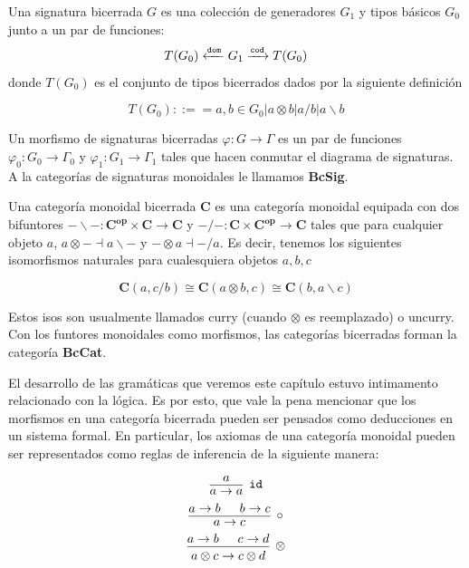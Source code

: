 \documentclass[../main.tex]{subfiles}
\begin{document}
	
	\begin{dfn}
	Una signatura bicerrada $G$ es una colección de generadores $G_1$ y tipos básicos $G_0$ junto a un par de funciones: \\
		$$T(G_0) \xleftarrow{\tt{dom}} G_1 \xrightarrow{\tt{cod}} T(G_0)$$
	donde $T(G_0)$ es el conjunto de tipos bicerrados dados por la siguiente definición
	
	$$T(G_0) ::== a, b \in G_0 | a \otimes b | a/b | a \backslash b$$
	
	Un morfismo de signaturas bicerradas $\varphi : G \to \Gamma$ es un par de funciones $\varphi_0 : G_0 \to \Gamma_0$ y $\varphi_1 : G_1 \to \Gamma_1$ tales que hacen conmutar el diagrama de signaturas. A la categorías de signaturas monoidales le llamamos \textbf{BcSig}. \\
	\end{dfn}
	
	\begin{dfn}
	Una categoría monoidal bicerrada \textbf{C} es una categoría monoidal equipada con dos bifuntores $- \backslash - : \textbf{C}^\textbf{op} \times \textbf{C} \to \textbf{C}$ y $- / - : \textbf{C} \times \textbf{C}^\textbf{op} \to \textbf{C}$ 
	tales que para cualquier objeto $a$, $a \otimes - \dashv a \backslash -$ y $- \otimes a \dashv - / a$. Es decir, tenemos los siguientes isomorfismos naturales para cualesquiera objetos $a,b,c$
	
	\begin{equation}
		\textbf{C}(a,c/b) \cong \textbf{C}(a \otimes b, c) \cong \textbf{C}(b, a\backslash c)
		\label{curry}	
	\end{equation}
	
	
	\end{dfn}
	
	Estos isos son usualmente llamados curry (cuando $\otimes$ es reemplazado) o uncurry. Con los funtores monoidales como morfismos, las categorías bicerradas forman la categoría \textbf{BcCat}.
	
	El desarrollo de las gramáticas que veremos este capítulo estuvo intimamento relacionado con la lógica. Es por esto, que vale la pena mencionar que los morfismos en una categoría bicerrada pueden ser pensados como deducciones en un sistema formal. En particular, los axiomas de una categoría monoidal pueden ser representados como reglas de inferencia de la siguiente manera: 
	\begin{multicols}{3}
		\[
		\begin{prooftree}
			\hypo{a}
			\infer1[\tt{id}]{a \to a}
		\end{prooftree}
		\]
		\[
		\begin{prooftree}
			\hypo{a\to b}
			\hypo{b\to c}
			\infer2[$\circ$]{a \to c}
		\end{prooftree}
		\]
		\[
		\begin{prooftree}
			\hypo{a \to b}
			\hypo{c \to d}
			\infer2[$\otimes$]{a \otimes c \to c \otimes d}
		\end{prooftree}
		\]
	\end{multicols}
	
\end{document}
